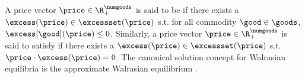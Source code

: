 A price vector $\price \in \R^\numgoods_+$ is said to be  if there exists a $\excess(\price) \in \excessset(\price)$ s.t. for all commodity $\good \in \goods$, $\excess[\good](\price) \leq 0$. Similarly, a price vector $\price \in \R^\numgoods_+$ is said to satisfy  if there exists a $\excess(\price) \in \excessset(\price)$ s.t. $\price \cdot \excess(\price) = 0$. 
% 
% 
The canonical solution concept for Walrasian equilibria is the approximate Walrasian equilibrium \cite{walras}. 
% 

